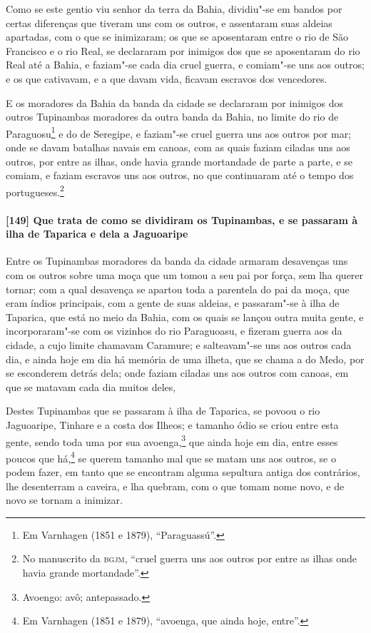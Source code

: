 Como se este gentio viu senhor da terra da Bahia, dividiu"-se em bandos por certas
diferenças que tiveram uns com os outros, e assentaram suas aldeias apartadas, com o que
se inimizaram; os que se aposentaram entre o rio de São Francisco e o rio Real, se
declararam por inimigos dos que se aposentaram do rio Real até a Bahia, e faziam"-se cada
dia cruel guerra, e comiam"-se uns aos outros; e os que cativavam, e a que davam vida,
ficavam escravos dos vencedores.

E os moradores da Bahia da banda da cidade se declararam por inimigos dos outros
Tupinambas moradores da outra banda da Bahia, no limite do rio de Paraguosu\footnote{ Em
Varnhagen (1851 e 1879), ``Paraguassú''.} e do de Seregipe, e faziam"-se cruel guerra uns
aos outros por mar; onde se davam batalhas navais em canoas, com as quais faziam ciladas
uns aos outros, por entre as ilhas, onde havia grande mortandade de parte a parte, e se
comiam, e faziam escravos uns aos outros, no que continuaram até o tempo dos
portugueses.\footnote{ No manuscrito da \textsc{bgjm}, ``cruel guerra uns aos outros por
entre as ilhas onde havia grande mortandade''.}

\paragraph{[149] Que trata de como se dividiram os Tupinambas, e se passaram à ilha de
Taparica e dela a Jaguoaripe}\quad
Entre os Tupinambas moradores da banda da cidade armaram desavenças uns com os outros
sobre uma moça que um tomou a seu pai por força, sem lha querer tornar; com a qual
desavença se apartou toda a parentela do pai da moça, que eram índios principais, com a
gente de suas aldeias, e passaram"-se à ilha de Taparica, que está no meio da Bahia, com os
quais se lançou outra muita gente, e incorporaram"-se com os vizinhos do rio Paraguoasu, e
fizeram guerra aos da cidade, a cujo limite chamavam Caramure; e salteavam"-se uns aos
outros cada dia, e ainda hoje em dia há memória de uma ilheta, que se chama a do Medo, por
se esconderem detrás dela; onde faziam ciladas uns aos outros com canoas, em que se
matavam cada dia muitos deles,

Destes Tupinambas que se passaram à ilha de Taparica, se povoou o rio Jaguoaripe, Tinhare
e a costa dos Ilheos; e tamanho ódio se criou entre esta gente, sendo toda uma por sua
avoenga,\footnote{ Avoengo: avô; antepassado.} que ainda hoje em dia, entre esses poucos
que há,\footnote{ Em Varnhagen (1851 e 1879), ``avoenga, que ainda hoje, entre''.} se
querem tamanho mal que se matam uns aos outros, se o podem fazer, em tanto que se
encontram alguma sepultura antiga dos contrários, lhe desenterram a caveira, e lha
quebram, com o que tomam nome novo, e de novo se tornam a inimizar.

